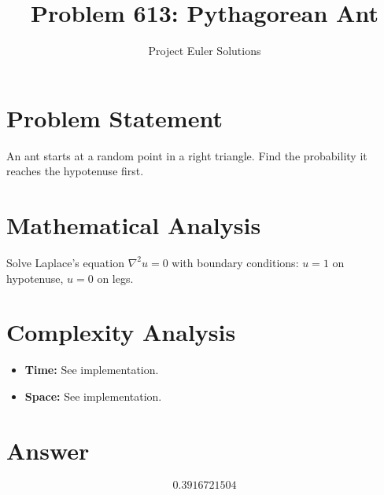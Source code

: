 \documentclass[11pt]{article}
\title{Problem 613: Pythagorean Ant}
\author{Project Euler Solutions}
\date{}
\begin{document}
\maketitle

\section{Problem Statement}
An ant starts at a random point in a right triangle. Find the probability it reaches the hypotenuse first.

\section{Mathematical Analysis}
Solve Laplace's equation $\nabla^2 u = 0$ with boundary conditions: $u = 1$ on hypotenuse, $u = 0$ on legs.

\section{Complexity Analysis}
\begin{itemize}
    \item \textbf{Time:} See implementation.
    \item \textbf{Space:} See implementation.
\end{itemize}

\section{Answer}

\[
\boxed{0.3916721504}
\]
\end{document}
